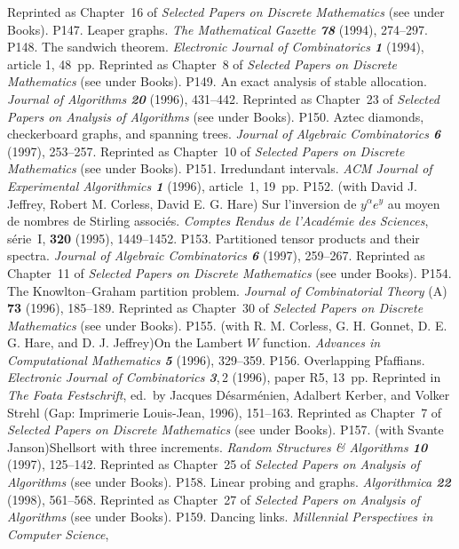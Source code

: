  Reprinted as Chapter~16 of {\sl Selected Papers on
 Discrete Mathematics\/} (see under Books).
\p P147. Leaper graphs. {\sl The Mathematical Gazette\/ \bf78} (1994),
 274--297.
\p P148. The sandwich theorem. {\sl Electronic Journal of Combinatorics\/
 \bf1} (1994), article 1, 48~pp.
 Reprinted as Chapter~8 of {\sl Selected Papers on
 Discrete Mathematics\/} (see under Books).
\p P149. An exact analysis of stable allocation. {\sl Journal of Algorithms\/
 \bf20} (1996), 431--442.
 Reprinted as Chapter~23 of {\sl Selected Papers on Analysis of Algorithms\/}
 (see under Books).
\p P150. Aztec diamonds, checkerboard graphs, and spanning trees. {\sl Journal
 of Algebraic Combinatorics\/ \bf6} (1997), 253--257.
 Reprinted as Chapter~10 of {\sl Selected Papers on
 Discrete Mathematics\/} (see under Books).
\p P151. Irredundant intervals. {\sl ACM Journal of Experimental
 Algorithmics\/ \bf1} (1996), article~1, 19~pp.
\p *P152. (with David J. Jeffrey, Robert M. Corless, David E. G. Hare)\xskip
 Sur l'inversion de $y^\alpha e^y$ au moyen de nombres de Stirling associ\'es.
 {\sl Comptes Rendus de l'Acad\'emie des Sciences\/}, s\'erie~I, {\bf320}
 (1995), 1449--1452.
\p P153. Partitioned tensor products and their spectra. {\sl Journal of
 Algebraic Combinatorics\/ \bf6} (1997), 259--267.
 Reprinted as Chapter~11 of {\sl Selected Papers on
 Discrete Mathematics\/} (see under Books).
\p P154. The Knowlton--Graham partition problem. {\sl Journal of Combinatorial
 Theory\/} (A) {\bf73} (1996), 185--189.
 Reprinted as Chapter~30 of {\sl Selected Papers on
 Discrete Mathematics\/} (see under Books).
\p *P155. (with R. M. Corless, G. H. Gonnet, D. E. G. Hare, and D. J.
 Jeffrey)\xskip On the Lambert $W$ function. {\sl Advances in Computational
 Mathematics\/ \bf5} (1996), 329--359.
\p P156. Overlapping Pfaffians. {\sl Electronic Journal of Combinatorics\/
 \bf3},\,2 (1996), paper R5, 13~pp. Reprinted in {\sl The Foata Festschrift},
 ed.~by Jacques D\'esarm\'enien, Adalbert Kerber, and Volker Strehl (Gap:
 Imprimerie Louis-Jean, 1996), 151--163.
 Reprinted as Chapter~7 of {\sl Selected Papers on
 Discrete Mathematics\/} (see under Books).
\p P157. (with Svante Janson)\xskip Shellsort with three increments.
 {\sl Random Structures \& Algorithms\/ \bf10} (1997), 125--142.
 Reprinted as Chapter~25 of {\sl Selected Papers on Analysis of Algorithms\/}
 (see under Books).
\p P158. Linear probing and graphs. {\sl Algorithmica\/ \bf22} (1998),
 561--568.
 Reprinted as Chapter~27 of {\sl Selected Papers on Analysis of Algorithms\/}
 (see under Books).
\p P159. Dancing links. {\sl Millennial Perspectives in Computer Science},
